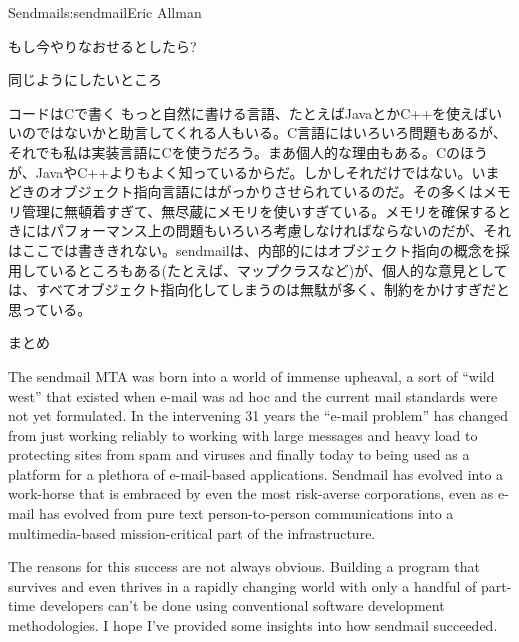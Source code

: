 \begin{aosachapter}{Sendmail}{s:sendmail}{Eric Allman}
\begin{aosasect1}{もし今やりなおせるとしたら?}
\begin{aosasect2}{同じようにしたいところ}
\begin{aosasect3}{コードはCで書く}
もっと自然に書ける言語、たとえばJavaとかC++を使えばいいのではないかと助言してくれる人もいる。C言語にはいろいろ問題もあるが、それでも私は実装言語にCを使うだろう。まあ個人的な理由もある。Cのほうが、JavaやC++よりもよく知っているからだ。しかしそれだけではない。いまどきのオブジェクト指向言語にはがっかりさせられているのだ。その多くはメモリ管理に無頓着すぎて、無尽蔵にメモリを使いすぎている。メモリを確保するときにはパフォーマンス上の問題もいろいろ考慮しなければならないのだが、それはここでは書ききれない。sendmailは、内部的にはオブジェクト指向の概念を採用しているところもある(たとえば、マップクラスなど)が、個人的な意見としては、すべてオブジェクト指向化してしまうのは無駄が多く、制約をかけすぎだと思っている。

\end{aosasect3}

\end{aosasect2}

\end{aosasect1}

\begin{aosasect1}{まとめ}

The sendmail MTA was born into a world of immense upheaval, a sort of
``wild west'' that existed when e-mail was ad hoc and the current mail
standards were not yet formulated.  In the intervening 31 years the
``e-mail problem'' has changed from just working reliably to working
with large messages and heavy load to protecting sites from spam and
viruses and finally today to being used as a platform for a plethora
of e-mail-based applications.  Sendmail has evolved into a work-horse
that is embraced by even the most risk-averse corporations, even as
e-mail has evolved from pure text person-to-person communications into
a multimedia-based mission-critical part of the infrastructure.

The reasons for this success are not always obvious.  Building a
program that survives and even thrives in a rapidly changing world
with only a handful of part-time developers can't be done using
conventional software development methodologies.  I hope I've provided
some insights into how sendmail succeeded.

\end{aosasect1}

\end{aosachapter}
